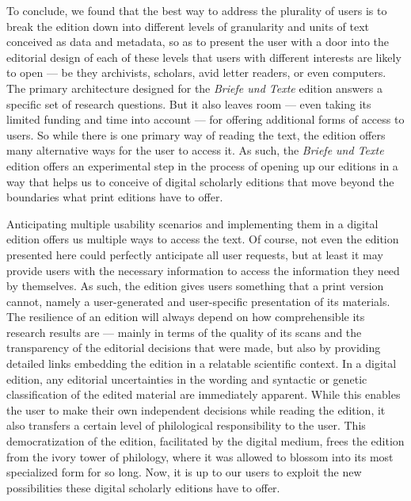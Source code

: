\begin{paper}
To conclude, we found that the best way to address the plurality of users is to break the edition down into different
levels of granularity and units of text conceived as data and
metadata, so as to present the user with a door into the editorial design of each of
these levels that users with different interests are likely to open --- be they archivists, scholars, avid letter readers, or even computers.
The primary architecture designed for the
\emph{Briefe und Texte} edition answers a specific set of research questions. But it also
leaves room --- even taking its limited funding and time into account --- for offering
additional forms of access to users. So while there is one primary way
of reading the text, the edition offers many alternative ways for the user to access it. As such, the  \emph{Briefe und Texte} edition offers
an experimental step in the process of opening up our editions in a way that helps us to
conceive of digital scholarly editions that move beyond the boundaries what print editions have to offer.

Anticipating multiple usability scenarios and
implementing them in a digital edition offers us multiple ways to access the text.
Of course, not even the edition presented here could perfectly anticipate
all user requests, but at least it may provide users with the necessary information to
access the information they need by themselves. As such, the
edition gives users something that a print version cannot, namely
a user-generated and user-specific presentation of its materials. The
resilience of an edition will always depend on how comprehensible its research results are --- mainly in terms of the quality of its scans and the transparency of the editorial decisions that were made, but also by providing detailed links embedding the edition in a relatable scientific context.
In a digital edition, any editorial uncertainties in the wording and syntactic or genetic classification of the
edited material are immediately apparent. While this enables the user to make their own independent
decisions while reading the edition, it also transfers a certain level of philological
responsibility to the user. This democratization of the edition, facilitated by the digital medium, frees the edition from the
ivory tower of philology, where it was allowed to blossom into its most
specialized form for so long. Now, it is up to our users to exploit the new
possibilities these digital scholarly editions have to offer.

\begin{flushleft}
  
\end{flushleft}
\end{paper}